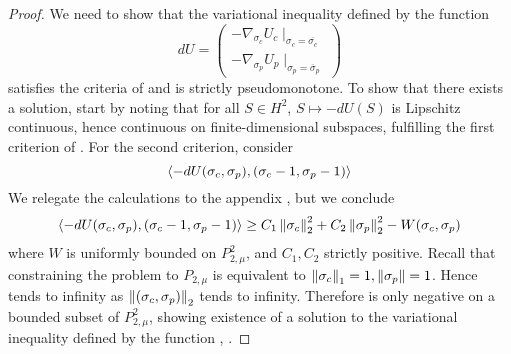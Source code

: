 \begin{proof}
  We need to show that the variational inequality defined by the function
  \begin{equation}
    \label{eq:var_ineq}
    dU = \begin{pmatrix}-\nabla_{\sigma_c} U_c \mid_{\sigma_c = \overbar{\sigma_c}} \\ -\nabla_{\sigma_p} U_p \mid_{\sigma_p = \overbar{\sigma}_p}\end{pmatrix}
  \end{equation} satisfies the criteria of  and is strictly pseudomonotone.
  To show that there exists a solution, start by noting that for all $S\in H^2$, $S\mapsto -dU(S)$ is Lipschitz continuous, hence continuous on finite-dimensional subspaces, fulfilling the first criterion of . For the second criterion, consider
  \begin{equation}
    \label{eq:du}
    \left \langle -dU(\sigma_c,\sigma_p),(\sigma_c-1, \sigma_p-1) \right \rangle
  \end{equation}
  We relegate the calculations to the appendix , but we conclude
  \begin{equation}
    \label{eq:fin_exist}
    \left \langle -dU(\sigma_c,\sigma_p),(\sigma_c-1, \sigma_p-1) \right \rangle \geq C_1\left \Vert \sigma_c \right \Vert_2^2 + C_2\left \Vert \sigma_p \right \Vert_2^2 - W(\sigma_c,\sigma_p)
  \end{equation}
  where $W$ is uniformly bounded on $P_{2,\mu}^2$, and $C_1,C_2$ strictly positive. Recall that constraining the problem to $P_{2,\mu}$ is equivalent to $\left \Vert \sigma_c \right \Vert_1 = 1, \left \Vert \sigma_p \right \Vert = 1$. Hence  tends to infinity as $\left \Vert (\sigma_c,\sigma_p) \right \Vert_2$ tends to infinity. Therefore  is only negative on a bounded subset of $P^2_{2,\mu}$, showing existence of a solution to the variational inequality defined by the function , .


\end{proof}
